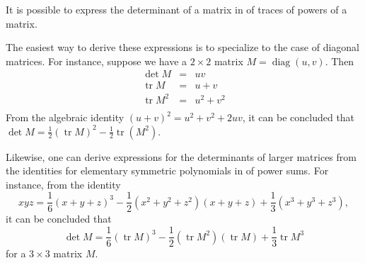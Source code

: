 \documentclass[12pt]{article}
\begin{document}
It is possible to express the determinant of a matrix in  of traces of 
powers of a matrix.

The easiest way to derive these expressions is to specialize to the case of
diagonal matrices.  For instance, suppose we have a $2 \times 2$ matrix $M = \operatorname{diag} (u,v)$.  Then 
\begin{eqnarray*}
\operatorname{det} M &=& uv \\
\operatorname{tr} M &=& u + v \\
\operatorname{tr} M^2 &=& u^2 + v^2 \\
\end{eqnarray*} 
From the algebraic identity $(u+v)^2 = u^2 + v^2 + 2uv$, it can be concluded that $\operatorname{det} M = \frac{1}{2} (\operatorname{tr} M)^2 - \frac{1}{2} \operatorname{tr} (M^2)$.

Likewise, one can derive expressions for the determinants of larger matrices from the identities for elementary symmetric polynomials in  of power sums.  For instance, from the identity 
\[xyz = \frac{1}{6} (x+y+z)^3 - \frac{1}{2} (x^2 + y^2 + z^2) (x + y + z) + \frac{1}{3} (x^3+ y^3 + z^3),\] 
it can be concluded that 
\[\operatorname{det} M = \frac{1}{6} (\operatorname{tr} M)^3 - \frac{1}{2} (\operatorname{tr} M^2)(\operatorname{tr} M) + \frac{1}{3} \operatorname{tr} M^3\]
for a $3\times 3$ matrix $M$.
\end{document}
